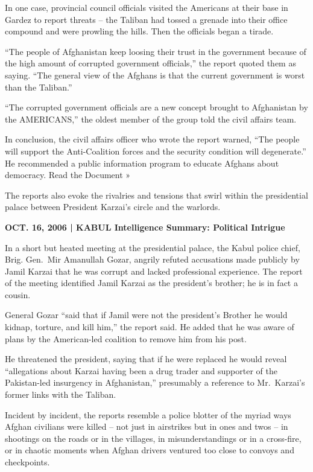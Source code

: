 ﻿\documentclass[12pt]{article}
\begin{document}
In one case, provincial council officials visited the Americans at their base in Gardez to report
threats -- the Taliban had tossed a grenade into their office compound and were prowling the hills.
Then the officials began a tirade.

``The people of Afghanistan keep loosing their trust in the government because of the high amount of
corrupted government officials,'' the report quoted them as saying. ``The general view of the
Afghans is that the current government is worst than the Taliban.''

``The corrupted government officials are a new concept brought to Afghanistan by the AMERICANS,''
the oldest member of the group told the civil affairs team.

In conclusion, the civil affairs officer who wrote the report warned, ``The people will support the
Anti-Coalition forces and the security condition will degenerate.'' He recommended a public
information program to educate Afghans about democracy. Read the Document »

The reports also evoke the rivalries and tensions that swirl within the presidential palace between
President Karzai's circle and the warlords.

\textbf{OCT. 16, 2006 | KABUL Intelligence Summary: Political Intrigue}

In a short but heated meeting at the presidential palace, the Kabul police chief, Brig. Gen.~Mir
Amanullah Gozar, angrily refuted accusations made publicly by Jamil Karzai that he was corrupt and
lacked professional experience. The report of the meeting identified Jamil Karzai as the president's
brother; he is in fact a cousin.

General Gozar ``said that if Jamil were not the president's Brother he would kidnap, torture, and
kill him,'' the report said. He added that he was aware of plans by the American-led coalition to
remove him from his post.

He threatened the president, saying that if he were replaced he would reveal ``allegations about
Karzai having been a drug trader and supporter of the Pakistan-led insurgency in Afghanistan,''
presumably a reference to Mr.~Karzai's former links with the Taliban.

Incident by incident, the reports resemble a police blotter of the myriad ways Afghan civilians were
killed -- not just in airstrikes but in ones and twos -- in shootings on the roads or in the
villages, in misunderstandings or in a cross-fire, or in chaotic moments when Afghan drivers
ventured too close to convoys and checkpoints.
\end{document}
